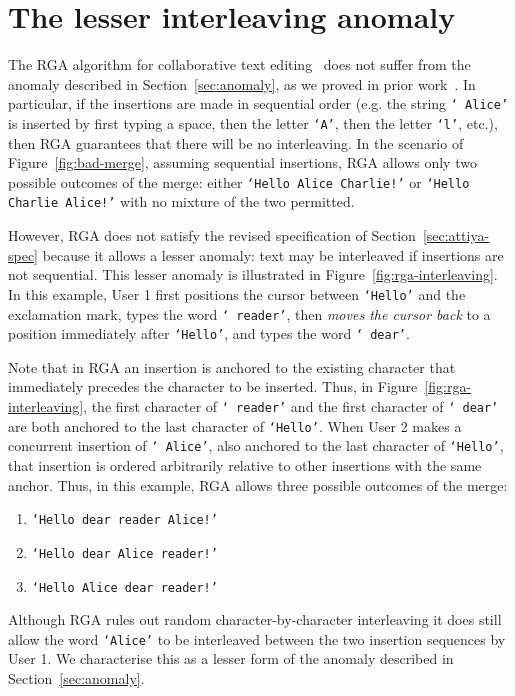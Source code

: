 \documentclass[sigconf]{acmart}
\begin{document}
\section{The lesser interleaving anomaly}\label{sec:lesser}

The RGA algorithm for collaborative text editing~\cite{Roh:2011dw} does not suffer from the anomaly described in Section~\ref{sec:anomaly}, as we proved in prior work~\cite{ExtendedVersion,AFP}.
In particular, if the insertions are made in sequential order (e.g. the string \texttt{` Alice'} is inserted by first typing a space, then the letter \texttt{`A'}, then the letter \texttt{`l'}, etc.), then RGA guarantees that there will be no interleaving.
In the scenario of Figure~\ref{fig:bad-merge}, assuming sequential insertions, RGA allows only two possible outcomes of the merge: either \texttt{`Hello Alice Charlie!'} or \texttt{`Hello Charlie Alice!'} with no mixture of the two permitted.

However, RGA does not satisfy the revised specification of Section~\ref{sec:attiya-spec} because it allows a lesser anomaly: text may be interleaved if insertions are not sequential.
This lesser anomaly is illustrated in Figure~\ref{fig:rga-interleaving}.
In this example, User 1 first positions the cursor between \texttt{`Hello'} and the exclamation mark, types the word \texttt{` reader'}, then \emph{moves the cursor back} to a position immediately after \texttt{`Hello'}, and types the word \texttt{` dear'}.

Note that in RGA an insertion is anchored to the existing character that immediately precedes the character to be inserted.
Thus, in Figure~\ref{fig:rga-interleaving}, the first character of \texttt{` reader'} and the first character of \texttt{` dear'} are both anchored to the last character of \texttt{`Hello'}.
When User 2 makes a concurrent insertion of \texttt{` Alice'}, also anchored to the last character of \texttt{`Hello'}, that insertion is ordered arbitrarily relative to other insertions with the same anchor.
Thus, in this example, RGA allows three possible outcomes of the merge:

\begin{enumerate}
\item \texttt{`Hello dear reader Alice!'}
\item \texttt{`Hello dear Alice reader!'}
\item \texttt{`Hello Alice dear reader!'}
\end{enumerate}

Although RGA rules out random character-by-character interleaving it does still allow the word \texttt{`Alice'} to be interleaved between the two insertion sequences by User 1.
We characterise this as a lesser form of the anomaly described in Section~\ref{sec:anomaly}.
\end{document}
